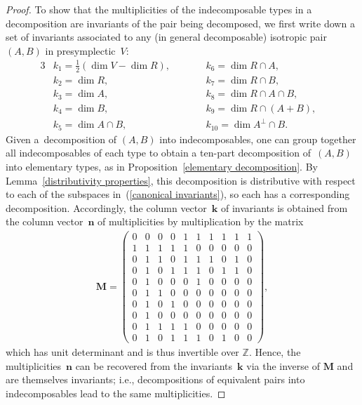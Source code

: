 \documentclass[pdftex]{sigma}
\numberwithin{equation}{section}
\begin{document}
\begin{proof}
To show that the multiplicities of the indecomposable types in a decomposition are invariants of the pair being decomposed, we f\/irst write down a set of invariants associated to any (in general decomposable) isotropic pair $(A,B)$ in presymplectic~$V$:
\begin{alignat}{3}
&k_1 = \tfrac{1}{2}(\dim V-\dim R),\qquad  && k_6 = \dim R \cap A, &\nonumber  \\
&k_2 = \dim R,\qquad  && k_7 = \dim R \cap B, &\nonumber  \\
&k_3 =  \dim A,\qquad  && k_8 = \dim R \cap A \cap B, &  \label{canonical invariants}\\
&k_4 =  \dim B,\qquad  && k_9 = \dim R \cap (A + B), &\nonumber  \\
&k_5 =  \dim A  \cap B,\qquad  &&   k_{10} = \dim A^{\perp} \cap B. &\nonumber
\end{alignat}
Given  a~decomposition of $(A,B)$ into indecomposables, one can group together all indecomposables of each type to obtain a ten-part decomposition of~$(A,B)$ into elementary types, as in Proposition~\ref{elementary decomposition}. By Lemma~\ref{distributivity properties}, this decomposition is distributive with respect to each of the subspaces in~(\ref{canonical invariants}), so each has a corresponding decomposition. Accordingly, the column vector~$\textbf{k}$ of invariants is obtained from the column vector~$\textbf{n}$ of multiplicities by multiplication by the matrix
\begin{gather*}
{\mathbf M} =
\left(
\begin{matrix}
0 & 0 & 0 & 0 & 1 & 1 & 1 & 1 & 1 & 1 \\
1 & 1 & 1 & 1 & 1 & 0 & 0 & 0 & 0 & 0 \\
0 & 1 & 1 & 0 & 1 & 1 & 1 & 0 & 1 & 0 \\
0 & 1 & 0 & 1 & 1 & 1 & 0 & 1 & 1 & 0 \\
0 & 1 & 0 & 0 & 0 & 1 & 0 & 0 & 0 & 0 \\
0 & 1 & 1 & 0 & 0 & 0 & 0 & 0 & 0 & 0 \\
0 & 1 & 0 & 1 & 0 & 0 & 0 & 0 & 0 & 0 \\
0 & 1 & 0 & 0 & 0 & 0 & 0 & 0 & 0 & 0 \\
0 & 1 & 1 & 1 & 1 & 0 & 0 & 0 & 0 & 0 \\
0 & 1 & 0 & 1 & 1 & 1 & 0 & 1 & 0 & 0
\end{matrix}
\right),
\end{gather*}
which has unit determinant and is thus invertible over $\mathbb{Z}$. Hence, the multiplicities~$\textbf{n}$ can be recovered from the invariants~$\textbf{k}$ via the inverse of $\mathbf{M}$ and are themselves invariants; i.e., decompositions of equivalent pairs into indecomposables lead to the same multiplicities.
\end{proof}
\end{document}

